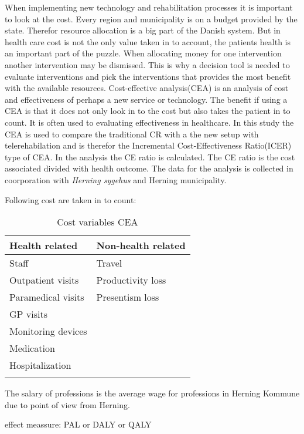 When implementing new technology and rehabilitation processes it is important to look at the cost. Every region and municipality is on a budget provided by the state. Therefor resource allocation is a big part of the Danish system. But in health care cost is not the only value taken in to account, the patients health is an important part of the puzzle. When allocating money for one intervention another intervention may be dismissed. This is why a decision tool is needed to evaluate interventions and pick the interventions that provides the most benefit with the available resources.
Cost-effective analysis(CEA) is an analysis of cost and effectiveness of perhaps a new service or technology. The benefit if using a CEA is that it does not only look in to the cost but also takes the patient in to count. It is often used to evaluating effectiveness in healthcare. In this study the CEA is used to compare the traditional CR with a the new setup with telerehabilation and is therefor the Incremental Cost-Effectiveness Ratio(ICER) type of CEA. In the analysis the CE ratio is calculated. The CE ratio is the cost associated divided with health outcome.
The data for the analysis is collected in coorporation with \textit{Herning sygehus} and Herning municipality. 

Following cost are taken in to count:

\begin{longtabu} to 
	\textbf{Health related} & \textbf{Non-health related}\\[-1ex]
	\midrule
	Staff & Travel \\[-1ex]
	Outpatient visits & Productivity loss \\[-1ex]
	Paramedical visits & Presentism loss\\[-1ex]
	GP visits &  \\[-1ex]
	Monitoring devices &  \\[-1ex]
	Medication &  \\[-1ex]
	Hospitalization &  \\[-1ex]
	\hline
	\caption{Cost variables CEA}
\end{longtabu}

The salary of professions is the average wage for professions in Herning Kommune due to point of view from Herning. 

effect meassure:
PAL or DALY or QALY



